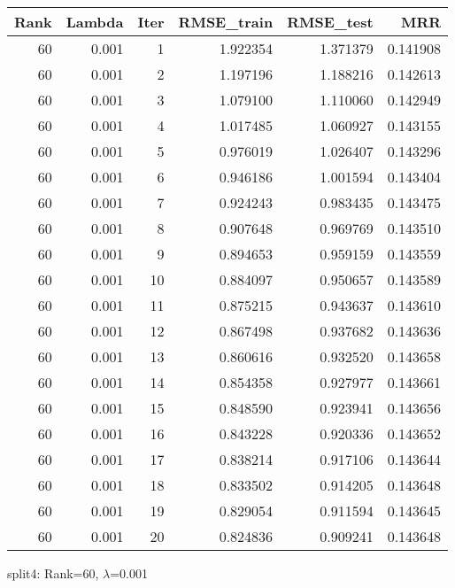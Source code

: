 \begin{tabular}{rrrrrr}
\toprule
 Rank &  Lambda &  Iter &  RMSE\_train &  RMSE\_test &       MRR \\
\midrule
   60 &   0.001 &     1 &    1.922354 &   1.371379 &  0.141908 \\
   60 &   0.001 &     2 &    1.197196 &   1.188216 &  0.142613 \\
   60 &   0.001 &     3 &    1.079100 &   1.110060 &  0.142949 \\
   60 &   0.001 &     4 &    1.017485 &   1.060927 &  0.143155 \\
   60 &   0.001 &     5 &    0.976019 &   1.026407 &  0.143296 \\
   60 &   0.001 &     6 &    0.946186 &   1.001594 &  0.143404 \\
   60 &   0.001 &     7 &    0.924243 &   0.983435 &  0.143475 \\
   60 &   0.001 &     8 &    0.907648 &   0.969769 &  0.143510 \\
   60 &   0.001 &     9 &    0.894653 &   0.959159 &  0.143559 \\
   60 &   0.001 &    10 &    0.884097 &   0.950657 &  0.143589 \\
   60 &   0.001 &    11 &    0.875215 &   0.943637 &  0.143610 \\
   60 &   0.001 &    12 &    0.867498 &   0.937682 &  0.143636 \\
   60 &   0.001 &    13 &    0.860616 &   0.932520 &  0.143658 \\
   60 &   0.001 &    14 &    0.854358 &   0.927977 &  0.143661 \\
   60 &   0.001 &    15 &    0.848590 &   0.923941 &  0.143656 \\
   60 &   0.001 &    16 &    0.843228 &   0.920336 &  0.143652 \\
   60 &   0.001 &    17 &    0.838214 &   0.917106 &  0.143644 \\
   60 &   0.001 &    18 &    0.833502 &   0.914205 &  0.143648 \\
   60 &   0.001 &    19 &    0.829054 &   0.911594 &  0.143645 \\
   60 &   0.001 &    20 &    0.824836 &   0.909241 &  0.143648 \\
\bottomrule
\end{tabular}

\caption{split4: Rank=60, $\lambda$=0.001}
